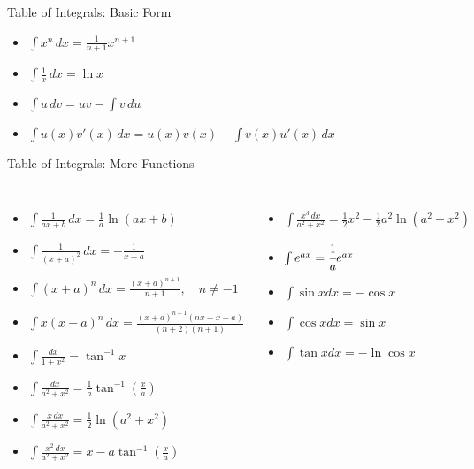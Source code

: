 \documentclass[aspectratio=169,xcolor=dvipsnames,svgnames,x11names,fleqn]{beamer}
\begin{document}
\begin{frame}{Table of Integrals: Basic Form}

\begin{itemize}
    \item $\int x^n \, dx = \frac{1}{n+1} x^{n+1}$
    \item $\int \frac{1}{x} \, dx = \ln x$
    \item $\int u \, dv = uv - \int v \, du$
    \item $\int u(x)v'(x) \, dx = u(x)v(x) - \int v(x)u'(x) \, dx$
\end{itemize}
    
\end{frame}


\begin{frame}{Table of Integrals: More Functions}
\begin{columns}
    \begin{itemize}
    \item $\int \frac{1}{ax + b} \, dx = \frac{1}{a} \ln(ax + b)$
    \item $\int \frac{1}{(x + a)^2} \, dx = -\frac{1}{x + a}$
    \item $\int (x + a)^n \, dx = \frac{(x + a)^{n+1}}{n+1}, \quad n \neq -1$
    \item $\int x(x + a)^n \, dx = \frac{(x + a)^{n+1}(nx + x - a)}{(n+2)(n+1)}$
    \item $\int \frac{dx}{1 + x^2} = \tan^{-1} x$
    \item $\int \frac{dx}{a^2 + x^2} = \frac{1}{a} \tan^{-1} \left(\frac{x}{a}\right)$
    \item $\int \frac{x \, dx}{a^2 + x^2} = \frac{1}{2} \ln(a^2 + x^2)$
    \item $\int \frac{x^2 \, dx}{a^2 + x^2} = x - a \tan^{-1} \left(\frac{x}{a}\right)$
\end{itemize}

\begin{itemize}
     
    \item $\int \frac{x^3 \, dx}{a^2 + x^2} = \frac{1}{2} x^2 - \frac{1}{2} a^2 \ln(a^2 + x^2)$
    \item $\int e^{ax} = \cfrac{1}{a}e^{ax}$
    \item $\int \sin x dx = -\cos x$
    \item $\int \cos x dx = \sin x$
    \item $\int \tan x dx = -\ln \cos x$
    
\end{itemize}
\end{columns}
\end{frame}
\end{document}
